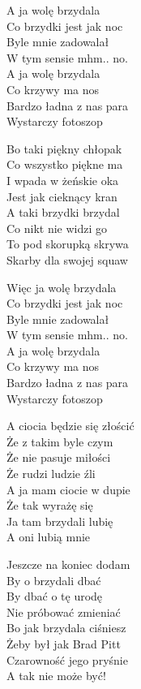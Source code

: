 \begin{text}
    A ja wolę brzydala\\
    Co brzydki jest jak noc\\
    Byle mnie zadowalał\\
    W tym sensie mhm.. no.\\
    A ja wolę brzydala\\
    Co krzywy ma nos\\
    Bardzo ładna z nas para\\
    Wystarczy fotoszop

    Bo taki piękny chłopak\\
    Co wszystko piękne ma\\
    I wpada w żeńskie oka\\
    Jest jak cieknący kran\\
    A taki brzydki brzydal\\
    Co nikt nie widzi go\\
    To pod skorupką skrywa\\
    Skarby dla swojej squaw

    \vin Więc ja wolę brzydala\\
    \vin Co brzydki jest jak noc\\
    \vin Byle mnie zadowalał\\
    \vin W tym sensie mhm.. no.\\
    \vin A ja wolę brzydala\\
    \vin Co krzywy ma nos\\
    \vin Bardzo ładna z nas para\\
    \vin Wystarczy fotoszop

    A ciocia będzie się złościć\\
    Że z takim byle czym\\
    Że nie pasuje miłości\\
    Że rudzi ludzie źli\\
    A ja mam ciocie w dupie\\
    Że tak wyrażę się\\
    Ja tam brzydali lubię\\
    A oni lubią mnie
\end{text}
\begin{chord}

\end{chord}
\TwelvePage
\begin{text}
    Jeszcze na koniec dodam\\
    By o brzydali dbać\\
    By dbać o tę urodę\\
    Nie próbować zmieniać\\
    Bo jak brzydala ciśniesz\\
    Żeby był jak Brad Pitt\\
    Czarowność jego pryśnie\\
    A tak nie może być!
\end{text}
\begin{chord}

\end{chord}